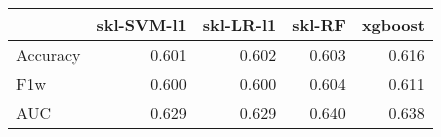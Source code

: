 \begin{tabular}{lrrrr}
\toprule
{} &  skl-SVM-l1 &  skl-LR-l1 &  skl-RF &  xgboost \\
\midrule
Accuracy &       0.601 &      0.602 &   0.603 &    0.616 \\
F1w      &       0.600 &      0.600 &   0.604 &    0.611 \\
AUC      &       0.629 &      0.629 &   0.640 &    0.638 \\
\bottomrule
\end{tabular}

